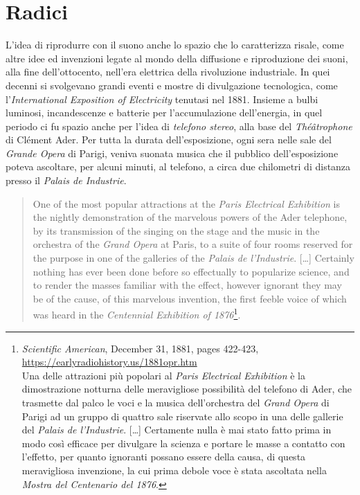 \section{Radici}

L'idea di riprodurre con il suono anche lo spazio che lo caratterizza risale,
come altre idee ed invenzioni legate al mondo della diffusione e riproduzione
dei suoni, alla fine dell'ottocento, nell'era elettrica della rivoluzione
industriale. In quei decenni si svolgevano grandi eventi e mostre di divulgazione
tecnologica, come l'\emph{International Exposition of Electricity} tenutasi nel 1881.
Insieme a bulbi luminosi, incandescenze e batterie per l'accumulazione
dell'energia, in quel periodo ci fu spazio anche per l'idea di \emph{telefono stereo},
alla base del \emph{Théâtrophone} di Clément Ader. Per tutta la durata
dell'esposizione, ogni sera nelle sale del \emph{Grande Opera} di Parigi, veniva
suonata musica che il pubblico dell'esposizione poteva ascoltare, per alcuni
minuti, al telefono, a circa due chilometri di distanza presso il
\emph{Palais de Industrie}.

\begin{quote}
One of the most popular attractions at the \emph{Paris Electrical Exhibition} is
the nightly demonstration of the marvelous powers of the Ader telephone, by its
transmission of the singing on the stage and the music in the orchestra of the
\emph{Grand Opera} at Paris, to a suite of four rooms reserved for the purpose
in one of the galleries of the \emph{Palais de l'Industrie}. [\ldots] Certainly
nothing has ever been done before so effectually to popularize science, and to
render the masses familiar with the effect, however ignorant they may be of the
cause, of this marvelous invention, the first feeble voice of which was heard in
the \emph{Centennial Exhibition of 1876}\footnote{ \emph{Scientific American},
December 31, 1881, pages 422-423,\\ \url{https://earlyradiohistory.us/1881opr.htm}\\
Una delle attrazioni più popolari al \emph{Paris Electrical Exhibition} è la
dimostrazione notturna delle meravigliose possibilità del telefono di Ader,
che trasmette dal palco le voci e la musica dell'orchestra del \emph{Grand Opera}
di Parigi ad un gruppo di quattro sale riservate allo scopo in una delle gallerie
del \emph{Palais de l'Industrie}. [\ldots] Certamente nulla è mai stato fatto
prima in modo così efficace per divulgare la scienza e portare le masse a contatto
con l'effetto, per quanto ignoranti possano essere della causa, di questa
meravigliosa invenzione, la cui prima debole voce è stata ascoltata nella
\emph{Mostra del Centenario del 1876}.}.
\end{quote}

